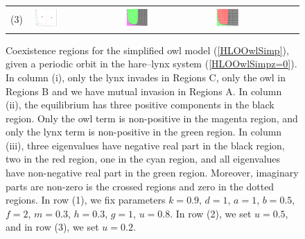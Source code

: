 \documentclass[12pt]{UOthesis}
\theoremstyle{remarkstyle}
\begin{document}
\begin{figure}[h!]
\begin{tabular}{m{0.07cm} m{4.5cm}  m{4.5cm}  m{4.5cm}}
		(3) & \includegraphics[width=0.33\textwidth]{HLOOwlSimpPOMutualInvasion3.png} & \includegraphics[width=0.33\textwidth]{HLOOwlSimpPOSteadyState3.png} & \includegraphics[width=0.33\textwidth]{HLOOwlSimpPOEigenvalues3.png}\\
	\end{tabular}
	\caption[Regions for the simplified owl model (periodic orbit)]{Coexistence regions for the simplified owl model (\ref{HLOOwlSimp}), given a periodic orbit in the hare--lynx system (\ref{HLOOwlSimpz=0}). In column (i), only the lynx invades in Regions C, only the owl in Regions B and we have mutual invasion in Regions A. In column (ii), the equilibrium has three positive components in the black region. Only the owl term is non-positive in the magenta region, and only the lynx term is non-positive in the green region. In column (iii), three eigenvalues have negative real part in the black region, two in the red region, one in the cyan region, and all eigenvalues have non-negative real part in the green region. Moreover, imaginary parts are non-zero is the crossed regions and zero in the dotted regions. In row (1), we fix parameters $k=0.9$, $d=1$, $a=1$, $b=0.5$, $f=2$, $m=0.3$, $h=0.3$, $g=1$, $u=0.8$. In row (2), we set $u=0.5$, and in row (3), we set $u=0.2$.\label{HLOOwlSimpPOPlots}}%
\end{figure}
\end{document}
